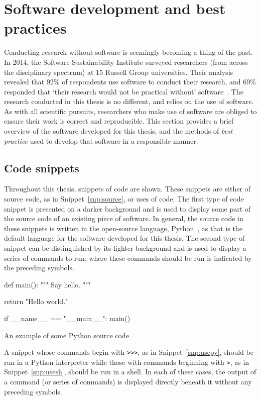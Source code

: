 \section{Software development and best practices}\label{sec:dev}

Conducting research without software is seemingly becoming a thing of the past.
In 2014, the Software Sustainability Institute surveyed researchers (from across
the disciplinary spectrum) at 15 Russell Group universities. Their analysis
revealed that 92\% of respondents use software to conduct their research, and
69\% responded that `their research would not be practical without'
software~\cite{Hettrick2014}. The research conducted in this thesis is no
different, and relies on the use of software. As with all scientific pursuits,
researchers who make use of software are obliged to ensure their work is correct
and reproducible. This section provides a brief overview of the software
developed for this thesis, and the methods of \emph{best practice} used to
develop that software in a responsible manner.

\subsection{Code snippets}

Throughout this thesis, snippets of code are shown. These snippets are either of
source code, as in Snippet~\ref{snp:source}, or uses of code. The first type of
code snippet is presented on a darker background and is used to display some
part of the source code of an existing piece of software. In general, the source
code in these snippets is written in the open-source language,
Python~\cite{python}, as that is the default language for the software developed
for this thesis. The second type of snippet can be distinguished by its lighter
background and is used to display a series of commands to run; where these
commands should be run is indicated by the preceding symbols.

\begin{listing}[htbp]
\begin{sourcepy}
def main():
    """ Say hello. """

    return "Hello world."

if __name__ == "__main__":
    main()
\end{sourcepy}
\caption{An example of some Python source code}\label{snp:source}
\end{listing}

A snippet whose commands begin with \texttt{>>>}, as in
Snippet~\ref{snp:usepy}, should be run in a Python interpreter while those with
commands beginning with \texttt{>}, as in Snippet~\ref{snp:usesh},
should be run in a shell. In each of these cases, the output of a command (or
series of commands) is displayed directly beneath it without any preceding
symbols.

